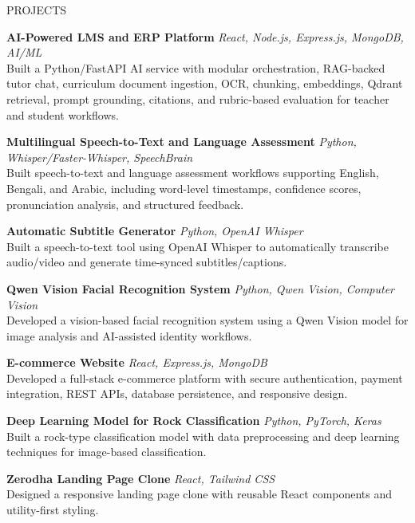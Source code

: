 \documentclass{resume}
\begin{document}

\begin{rSection}{PROJECTS}

\textbf{AI-Powered LMS and ERP Platform} \hfill \textit{React, Node.js, Express.js, MongoDB, AI/ML}\\
Built a Python/FastAPI AI service with modular orchestration, RAG-backed tutor chat, curriculum document ingestion, OCR, chunking, embeddings, Qdrant retrieval, prompt grounding, citations, and rubric-based evaluation for teacher and student workflows.

\textbf{Multilingual Speech-to-Text and Language Assessment} \hfill \textit{Python, Whisper/Faster-Whisper, SpeechBrain}\\
Built speech-to-text and language assessment workflows supporting English, Bengali, and Arabic, including word-level timestamps, confidence scores, pronunciation analysis, and structured feedback.

\textbf{Automatic Subtitle Generator} \hfill \textit{Python, OpenAI Whisper}\\
Built a speech-to-text tool using OpenAI Whisper to automatically transcribe audio/video and generate time-synced subtitles/captions.

\textbf{Qwen Vision Facial Recognition System} \hfill \textit{Python, Qwen Vision, Computer Vision}\\
Developed a vision-based facial recognition system using a Qwen Vision model for image analysis and AI-assisted identity workflows.

\textbf{E-commerce Website} \hfill \textit{React, Express.js, MongoDB}\\
Developed a full-stack e-commerce platform with secure authentication, payment integration, REST APIs, database persistence, and responsive design.

\textbf{Deep Learning Model for Rock Classification} \hfill \textit{Python, PyTorch, Keras}\\
Built a rock-type classification model with data preprocessing and deep learning techniques for image-based classification.

\textbf{Zerodha Landing Page Clone} \hfill \textit{React, Tailwind CSS}\\
Designed a responsive landing page clone with reusable React components and utility-first styling.

\end{rSection}
\end{document}
